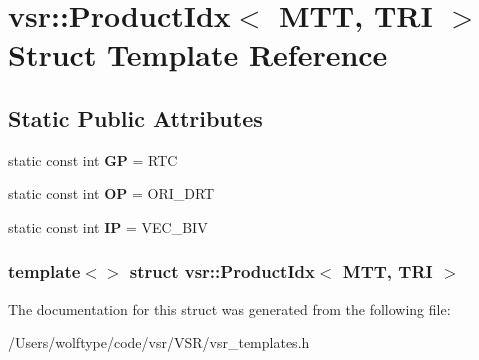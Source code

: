 \hypertarget{structvsr_1_1_product_idx_3_01_m_t_t_00_01_t_r_i_01_4}{\section{vsr\-:\-:Product\-Idx$<$ M\-T\-T, T\-R\-I $>$ Struct Template Reference}
\label{structvsr_1_1_product_idx_3_01_m_t_t_00_01_t_r_i_01_4}
}
\subsection*{Static Public Attributes}
\begin{DoxyCompactItemize}
\item 
\hypertarget{structvsr_1_1_product_idx_3_01_m_t_t_00_01_t_r_i_01_4_ae619d9726c1ff5796136336c641d2c63}{static const int {\bfseries G\-P} = R\-T\-C}\label{structvsr_1_1_product_idx_3_01_m_t_t_00_01_t_r_i_01_4_ae619d9726c1ff5796136336c641d2c63}

\item 
\hypertarget{structvsr_1_1_product_idx_3_01_m_t_t_00_01_t_r_i_01_4_a23c6180b754de03075f44b6b3e7badca}{static const int {\bfseries O\-P} = O\-R\-I\-\_\-\-D\-R\-T}\label{structvsr_1_1_product_idx_3_01_m_t_t_00_01_t_r_i_01_4_a23c6180b754de03075f44b6b3e7badca}

\item 
\hypertarget{structvsr_1_1_product_idx_3_01_m_t_t_00_01_t_r_i_01_4_a9c1ee82a9fc182c9d172a4177369b966}{static const int {\bfseries I\-P} = V\-E\-C\-\_\-\-B\-I\-V}\label{structvsr_1_1_product_idx_3_01_m_t_t_00_01_t_r_i_01_4_a9c1ee82a9fc182c9d172a4177369b966}

\end{DoxyCompactItemize}
\subsubsection*{template$<$$>$ struct vsr\-::\-Product\-Idx$<$ M\-T\-T, T\-R\-I $>$}



The documentation for this struct was generated from the following file\-:\begin{DoxyCompactItemize}
\item 
/\-Users/wolftype/code/vsr/\-V\-S\-R/vsr\-\_\-templates.\-h\end{DoxyCompactItemize}
